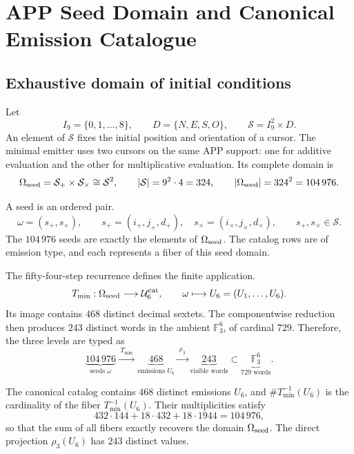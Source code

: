 \chapter{APP Seed Domain and Canonical Emission Catalogue}
\label{app:catalogo-semillas-app-rev9}

\section{Exhaustive domain of initial conditions}

Let
\[
 I_9=\{0,1,\ldots,8\},
 \qquad D=\{N,E,S,O\},
 \qquad \mathcal S=I_9^2\times D.
\]
An element of \(\mathcal S\) fixes the initial position and orientation of
a cursor. The minimal emitter uses two cursors on the same APP support:
one for additive evaluation and the other for multiplicative evaluation. Its
complete domain is
\[
 \Omega_{\rm seed}
 =\mathcal S_{+}\times\mathcal S_{\times}
 \cong\mathcal S^2,
 \qquad
 |\mathcal S|=9^2\cdot4=324,
 \qquad
 |\Omega_{\rm seed}|=324^2=104\,976.
\]

\begin{definition}
A seed is an ordered pair.
\[
 \omega=(s_+,s_\times),
 \qquad
 s_+=(i_+,j_+,d_+),\quad
 s_\times=(i_\times,j_\times,d_\times),
 \qquad s_+,s_\times\in\mathcal S.
\]
The \(104\,976\) seeds are exactly the elements of
\(\Omega_{\rm seed}\). The catalog rows are of emission type, and
each represents a fiber of this seed domain.
\end{definition}

The fifty-four-step recurrence defines the finite application.
\[
 T_{\min}:\Omega_{\rm seed}\longrightarrow\mathcal U_6^{\rm cat},
 \qquad
 \omega\longmapsto U_6=(U_1,\ldots,U_6).
\]
Its image contains \(468\) distinct decimal sextets. The componentwise
reduction then produces \(243\) distinct words in the
ambient \(\mathbb F_3^6\), of cardinal \(729\). Therefore, the three levels
are typed as
\[
 \underbrace{104\,976}_{\text{seeds }\omega}
 \xrightarrow{\;T_{\min}\;}
 \underbrace{468}_{\text{emissions }U_6}
 \xrightarrow{\;\rho_3\;}
 \underbrace{243}_{\text{visible words}}
 \subset
 \underbrace{\mathbb F_3^6}_{729\text{ words}}.
\]

\begin{theorem}
The canonical catalog contains \(468\) distinct emissions \(U_6\), and
\(\#T_{\min}^{-1}(U_6)\) is the cardinality of the fiber
\(T_{\min}^{-1}(U_6)\). Their multiplicities satisfy
\[
 432\cdot144+18\cdot432+18\cdot1944=104\,976,
\]
so that the sum of all fibers exactly recovers the domain
\(\Omega_{\rm seed}\). The direct projection
\(\rho_3(U_6)\) has \(243\) distinct values.
\end{theorem}

